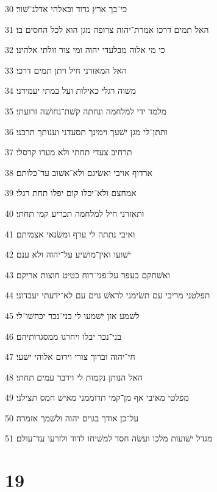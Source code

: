 \par 30 כי־בך ארץ גדוד ובאלהי אדלג־שׁור׃
\par 31 האל תמים דרכו אמרת־יהוה צרופה מגן הוא לכל החסים בו׃
\par 32 כי מי אלוה מבלעדי יהוה ומי צור זולתי אלהינו׃
\par 33 האל המאזרני חיל ויתן תמים דרכי׃
\par 34 משׁוה רגלי כאילות ועל במתי יעמידני׃
\par 35 מלמד ידי למלחמה ונחתה קשׁת־נחושׁה זרועתי׃
\par 36 ותתן־לי מגן ישׁעך וימינך תסעדני וענותך תרבני׃
\par 37 תרחיב צעדי תחתי ולא מעדו קרסלי׃
\par 38 ארדוף אויבי ואשׂיגם ולא־אשׁוב עד־כלותם׃
\par 39 אמחצם ולא־יכלו קום יפלו תחת רגלי׃
\par 40 ותאזרני חיל למלחמה תכריע קמי תחתי׃
\par 41 ואיבי נתתה לי ערף ומשׂנאי אצמיתם׃
\par 42 ישׁועו ואין־מושׁיע על־יהוה ולא ענם׃
\par 43 ואשׁחקם כעפר על־פני־רוח כטיט חוצות אריקם׃
\par 44 תפלטני מריבי עם תשׂימני לראשׁ גוים עם לא־ידעתי יעבדוני׃
\par 45 לשׁמע אזן ישׁמעו לי בני־נכר יכחשׁו־לי׃
\par 46 בני־נכר יבלו ויחרגו ממסגרותיהם׃
\par 47 חי־יהוה וברוך צורי וירום אלוהי ישׁעי׃
\par 48 האל הנותן נקמות לי וידבר עמים תחתי׃
\par 49 מפלטי מאיבי אף מן־קמי תרוממני מאישׁ חמס תצילני׃
\par 50 על־כן אודך בגוים יהוה ולשׁמך אזמרה׃
\par 51 מגדל ישׁועות מלכו ועשׂה חסד למשׁיחו לדוד ולזרעו עד־עולם׃

\chapter{19}

